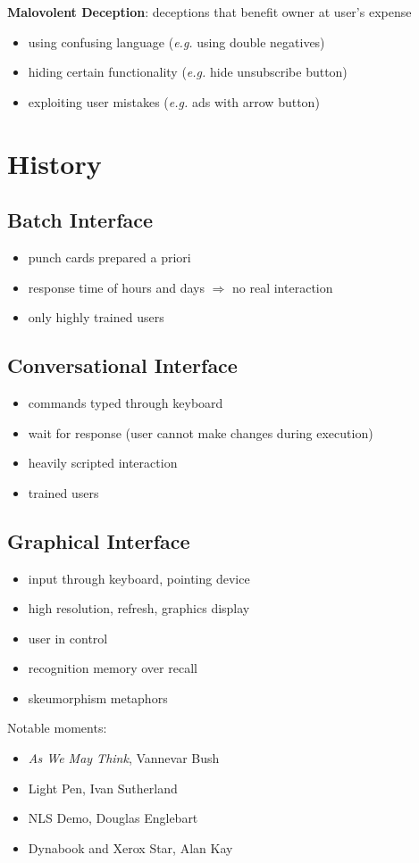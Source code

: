 \documentclass[]{article}
\theoremstyle{definition}
\begin{document}
	\textbf{Malovolent Deception}: deceptions that benefit owner at user's expense
	\begin{itemize}
		\item using confusing language (\textit{e.g.} using double negatives)
		\item hiding certain functionality (\textit{e.g.} hide unsubscribe button)
		\item exploiting user mistakes (\textit{e.g.} ads with arrow button)
	\end{itemize}
	\section{History}
	\subsection{Batch Interface}
	\begin{itemize}
		\item punch cards prepared a priori
		\item response time of hours and days $\Rightarrow$ no real interaction
		\item only highly trained users
	\end{itemize}
	\subsection{Conversational Interface}
	\begin{itemize}
		\item commands typed through keyboard
		\item wait for response (user cannot make changes during execution)
		\item heavily scripted interaction
		\item trained users
	\end{itemize}
	\subsection{Graphical Interface}
	\begin{itemize}
		\item input through keyboard, pointing device
		\item high resolution, refresh, graphics display
		\item user in control
		\item recognition memory over recall
		\item skeumorphism metaphors
	\end{itemize}
	Notable moments:
	\begin{itemize}
		\item \textit{As We May Think}, Vannevar Bush
		\item Light Pen, Ivan Sutherland
		\item NLS Demo, Douglas Englebart
		\item Dynabook and Xerox Star, Alan Kay
	\end{itemize}
\end{document}
